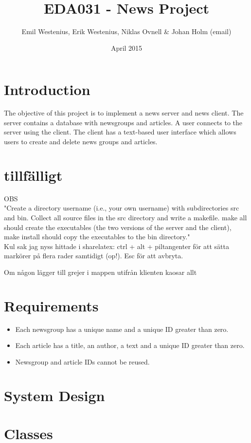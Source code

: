 \documentclass{article}
\title{EDA031 - News Project}
\author{Emil Westenius, Erik Westenius, Niklas Ovnell \& Johan Holm (email) }
\date{April 2015}
\begin{document}
\maketitle
\pagebreak
\section{Introduction}
The objective of this project is to implement a news server and news client. The server contains a database with newsgroups and articles. A user connects to the server using the client. The client has a text-based user interface which allows users to create and delete news groups and articles. 

\section{tillfälligt}
OBS\hfill\\
"Create a directory username (i.e., your own username) with subdirectories src and bin.
Collect all source files in the src directory and write a makefile. make all should create the
executables (the two versions of the server and the client), make install should copy the
executables to the bin directory."\hfill\\
Kul sak jag nyss hittade i sharelatex: ctrl + alt + piltangenter för att sätta markörer på flera rader samtidigt (op!). Esc för att avbryta.

Om någon lägger till grejer i mappen utifrån klienten kaosar allt

\section{Requirements}
\begin{itemize}
\item Each newsgroup has a unique name and a unique ID greater than zero.
\item Each article has a title, an author, a text and a unique ID greater than zero.
\item Newsgroup and article IDs cannot be reused. 
\end{itemize}

\section{System Design}

\section{Classes}
\end{document}
